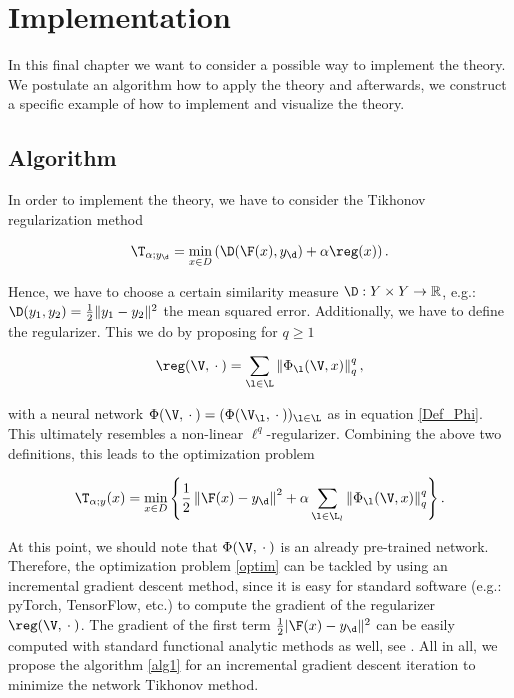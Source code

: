 \chapter{Implementation}

In this final chapter we want to consider a possible way to implement the theory. We postulate an algorithm how to apply the theory and afterwards, we construct a specific example of how to implement and visualize the theory.

\section{Algorithm}

In order to implement the theory, we have to consider the Tikhonov regularization method

\begin{align*}
\T_{\a;y_\d} = \min_{x \in D} \left( \D(\F(x), y_\d) + \a \reg(x) \right).
\end{align*}

Hence, we have to choose a certain similarity measure $\D: Y \times Y \to \R$, e.g.: $\D(y_1,y_2) = \frac{1}{2}\|y_1-y_2\|^2$ the mean squared error. Additionally, we have to define the regularizer. This we do by proposing for $q\geq 1$

\begin{align*}
\reg(\V,\wc) = \sum_{\l\in\L} \left\|\Phi_{\l}(\V,x) \right\|_{q}^q,
\end{align*}

with a neural network $\Phi(\V,\wc) = (\Phi(\V_\l,\wc))_{\l\in\L}$ as in equation \eqref{Def_Phi}. This ultimately resembles a non-linear $\ell^q$-regularizer. Combining the above two definitions, this leads to the optimization problem

\begin{align}\label{optim}
\T_{\a;y}(x) = \min_{x \in D} \left\{\frac{1}{2}\left\|\F(x) - y_\d\right\|^2 + \a \sum_{\l\in\L_l} \left\|\Phi_{\l}(\V,x) \right\|_{q}^q \right\}.
\end{align}

At this point, we should note that $\Phi(\V,\wc)$ is an already pre-trained network. Therefore, the optimization problem \eqref{optim} can be tackled by using an incremental gradient descent method, since it is easy for standard software (e.g.: pyTorch, TensorFlow, etc.) to compute the gradient of the regularizer $\reg(\V,\wc)$. The gradient of the first term $\frac{1}{2}|\F(x) - y_\d\|^2$ can be easily computed with standard functional analytic methods as well, see \cite{werner2006funktionalanalysis}.
\newpage
All in all, we propose the algorithm \ref{alg1} for an incremental gradient descent iteration to minimize the network Tikhonov method.

